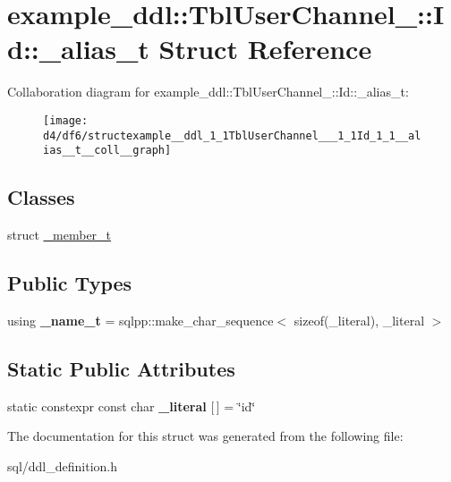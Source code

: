 \hypertarget{structexample__ddl_1_1TblUserChannel___1_1Id_1_1__alias__t}{}\section{example\+\_\+ddl\+:\+:Tbl\+User\+Channel\+\_\+\+:\+:Id\+:\+:\+\_\+alias\+\_\+t Struct Reference}
\label{structexample__ddl_1_1TblUserChannel___1_1Id_1_1__alias__t}


Collaboration diagram for example\+\_\+ddl\+:\+:Tbl\+User\+Channel\+\_\+\+:\+:Id\+:\+:\+\_\+alias\+\_\+t\+:
\nopagebreak
\begin{figure}[H]
\begin{center}
\leavevmode
\texttt{[image: d4/df6/structexample\_\_ddl\_1\_1TblUserChannel\_\_\_1\_1Id\_1\_1\_\_alias\_\_t\_\_coll\_\_graph]}
\end{center}
\end{figure}
\subsection*{Classes}
\begin{DoxyCompactItemize}
\item 
struct \hyperlink{structexample__ddl_1_1TblUserChannel___1_1Id_1_1__alias__t_1_1__member__t}{\+\_\+member\+\_\+t}
\end{DoxyCompactItemize}
\subsection*{Public Types}
\begin{DoxyCompactItemize}
\item 
\hypertarget{structexample__ddl_1_1TblUserChannel___1_1Id_1_1__alias__t_af2d7ee96298f1992fa29ae569d8f1f15}{}using {\bfseries \+\_\+name\+\_\+t} = sqlpp\+::make\+\_\+char\+\_\+sequence$<$ sizeof(\+\_\+literal), \+\_\+literal $>$\label{structexample__ddl_1_1TblUserChannel___1_1Id_1_1__alias__t_af2d7ee96298f1992fa29ae569d8f1f15}

\end{DoxyCompactItemize}
\subsection*{Static Public Attributes}
\begin{DoxyCompactItemize}
\item 
\hypertarget{structexample__ddl_1_1TblUserChannel___1_1Id_1_1__alias__t_a162c060b19a4ccdf0e8e1174edad00ee}{}static constexpr const char {\bfseries \+\_\+literal} \mbox{[}$\,$\mbox{]} = \char`\"{}id\char`\"{}\label{structexample__ddl_1_1TblUserChannel___1_1Id_1_1__alias__t_a162c060b19a4ccdf0e8e1174edad00ee}

\end{DoxyCompactItemize}


The documentation for this struct was generated from the following file\+:\begin{DoxyCompactItemize}
\item 
sql/ddl\+\_\+definition.\+h\end{DoxyCompactItemize}
